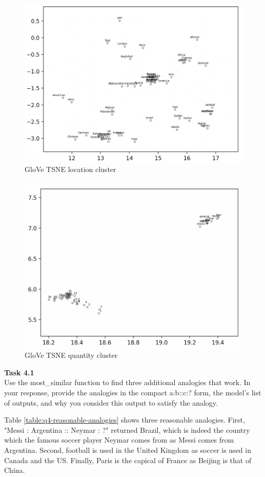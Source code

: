 \documentclass[12pt,article]{article}
\newenvironment{task}[2][Task]
    { \begin{mdframed}[backgroundcolor=gray!20] \textbf{#1 #2} \\}
    {  \end{mdframed}}
\begin{document}
\begin{figure}[H]
    \centering
    \includegraphics[scale=0.5]{glove_tsne_location_cluster.png} \par
    \caption{GloVe TSNE location cluster}
    \label{fig:q3-tsne-location}
\end{figure}

\begin{figure}[H]
    \centering
    \includegraphics[scale=0.5]{glove_tsne_quantity_cluster.png} \par
    \caption{GloVe TSNE quantity cluster}
    \label{fig:q3-tsne-quantity}
\end{figure}
\newpage
\begin{task}{4.1} 
Use the most\_similar function to find three additional analogies that work. In your response, provide the analogies in the compact a:b::c:? form, the model's list of outputs, and why you consider this output to satisfy the analogy.
\end{task}
Table \ref{table:q4-reasonable-analogies} shows three reasonable analogies. First, "Messi : Argentina :: Neymar : ?" returned Brazil, which is indeed the country which the famous soccer player Neymar comes from as Messi comes from Argentina. Second, football is used in the United Kingdom as soccer is used in Canada and the US. Finally, Paris is the capical of France as Beijing is that of China.
\end{document}
